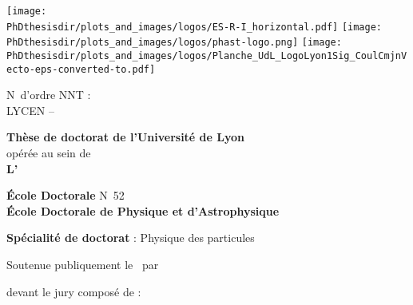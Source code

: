 \thispagestyle{empty}
\begin{center}
\large

\texttt{[image: \\PhDthesisdir/plots\_and\_images/logos/ES-R-I\_horizontal.pdf]}
\hfill
\texttt{[image: \\PhDthesisdir/plots\_and\_images/logos/phast-logo.png]}
\hfill
\texttt{[image: \\PhDthesisdir/plots\_and\_images/logos/Planche\_UdL\_LogoLyon1Sig\_CoulCmjnVecto-eps-converted-to.pdf]}

\begin{flushleft}
N\degree\ d'ordre NNT : \NordreNNT\\
LYCEN -- \LYCEN
\end{flushleft}

\vspace{5mm}

{\LARGE \textbf{Thèse de doctorat de l'Université de Lyon}}\\
opérée au sein de\\
\textbf{L'\insertinstitute}

\vspace{.75cm}

\textbf{École Doctorale} N\degree\ 52\\
\textbf{École Doctorale de Physique et d'Astrophysique}

\vspace{.75cm}

\textbf{Spécialité de doctorat} : Physique des particules

\vspace{1.25cm}

Soutenue publiquement le \insertdate\ par

\vspace{.75cm}

{\LARGE \textbf{\insertauthor}}

\vspace{1.25cm}

\textbf{\huge\inserttitle}

\vfill
devant le jury composé de :

\vspace{.25cm}



\vspace{.5cm}


\end{center}
